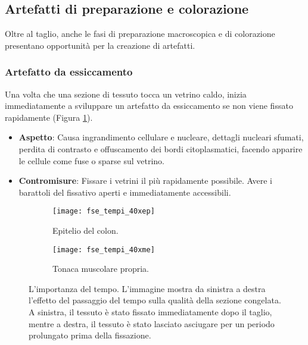 \subsection{Artefatti di preparazione e colorazione}
Oltre al taglio, anche le fasi di preparazione macroscopica e di colorazione presentano opportunità per la creazione di artefatti. 

\subsubsection{Artefatto da essiccamento}
Una volta che una sezione di tessuto tocca un vetrino caldo, inizia immediatamente a sviluppare un artefatto da essiccamento se non viene fissato rapidamente (Figura \ref{fig:importanza_tempo}). 
\begin{itemize}
    \item   \textbf{Aspetto}: Causa ingrandimento cellulare e nucleare, dettagli nucleari sfumati, perdita di contrasto e offuscamento dei bordi citoplasmatici, facendo apparire le cellule come fuse o sparse sul vetrino. 
    \item   \textbf{Contromisure}: Fissare i vetrini il più rapidamente possibile. Avere i barattoli del fissativo aperti e immediatamente accessibili. 
\end{itemize}

\begin{figure}[htbp]
    \centering
    \begin{subfigure}[a]{0.90\textwidth}
        \centering
        \texttt{[image: fse\_tempi\_40xep]}
        \caption{Epitelio del colon.}
    \end{subfigure}
      \begin{subfigure}[a]{0.90\textwidth}
        \centering
        \texttt{[image: fse\_tempi\_40xme]}
        \caption{Tonaca muscolare propria.}
    \end{subfigure}
    \caption{L'importanza del tempo. L'immagine mostra da sinistra a destra l'effetto del passaggio del tempo sulla qualità della sezione congelata.  A sinistra, il tessuto è stato fissato immediatamente dopo il taglio, mentre a destra, il tessuto è stato lasciato asciugare per un periodo prolungato prima della fissazione.}
    \label{fig:importanza_tempo}
\end{figure}

